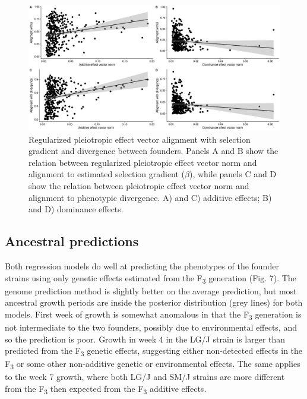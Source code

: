 \begin{refsection}
\begin{figure}
\includegraphics[width=\linewidth]{chapter_JoH-Melo_etal/media/growth_effect_aligment_regressions_GP.png}
\caption[Pleiotropic effect vector alignment]{Regularized pleiotropic effect vector alignment with selection
gradient and divergence between founders. Panels A and B show the relation between regularized pleiotropic effect vector norm and alignment to estimated selection gradient ($\beta$), while panels C and D show the relation between
pleiotropic effect vector norm and alignment to phenotypic divergence. A)
and C) additive effects; B) and D) dominance effects.}
\end{figure}

\subsection{Ancestral predictions}

Both regression models do well at predicting the phenotypes of the
founder strains using only genetic effects estimated from the
F\textsubscript{3} generation (Fig. 7). The genome prediction method is
slightly better on the average prediction, but most ancestral growth
periods are inside the posterior distribution (grey lines) for both
models. First week of growth is somewhat anomalous in that the
F\textsubscript{3} generation is not intermediate to the two founders,
possibly due to environmental effects, and so the prediction is poor.
Growth in week 4 in the LG/J strain is larger than predicted from the
F\textsubscript{3} genetic effects, suggesting either non-detected
effects in the F\textsubscript{3} or some other non-additive genetic or
environmental effects. The same applies to the week 7 growth, where both
LG/J and SM/J strains are more different from the F\textsubscript{3}
then expected from the F\textsubscript{3} additive effects.


\end{refsection}
